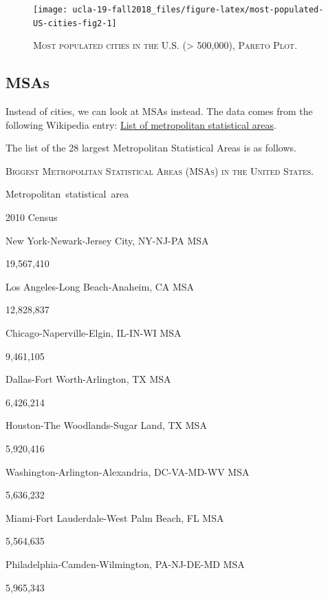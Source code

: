 \documentclass[]{book}
\theoremstyle{definition}
\theoremstyle{definition}
\theoremstyle{definition}
\theoremstyle{remark}
\begin{document}
\begin{figure}

{\centering \texttt{[image: ucla-19-fall2018\_files/figure-latex/most-populated-US-cities-fig2-1]} 

}

\caption{\textsc{Most populated cities in the
U.S. (\textgreater{} 500,000), Pareto Plot.}}\label{fig:most-populated-US-cities-fig2}
\end{figure}

\subsection{MSAs}\label{msas}

Instead of cities, we can look at MSAs instead. The data comes from the
following Wikipedia entry:
\href{https://en.wikipedia.org/wiki/List_of_metropolitan_statistical_areas}{List
of metropolitan statistical areas}.










The list of the 28 largest Metropolitan Statistical Areas is as follows.

\label{tab:unnamed-chunk-9}\textsc{Biggest Metropolitan Statistical Areas (MSAs)
in the United States.}

Metropolitan~statistical~area

2010 Census

New York-Newark-Jersey City, NY-NJ-PA MSA

19,567,410

Los Angeles-Long Beach-Anaheim, CA MSA

12,828,837

Chicago-Naperville-Elgin, IL-IN-WI MSA

9,461,105

Dallas-Fort Worth-Arlington, TX MSA

6,426,214

Houston-The Woodlands-Sugar Land, TX MSA

5,920,416

Washington-Arlington-Alexandria, DC-VA-MD-WV MSA

5,636,232

Miami-Fort Lauderdale-West Palm Beach, FL MSA

5,564,635

Philadelphia-Camden-Wilmington, PA-NJ-DE-MD MSA

5,965,343
\end{document}
